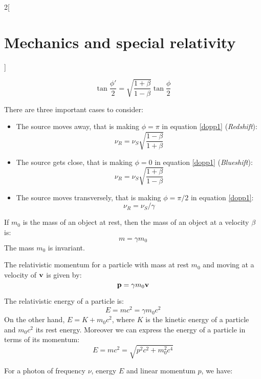 \documentclass[../../../main.tex]{subfiles}
\begin{document}
\begin{multicols}{2}[\section{Mechanics and special relativity}]
\begin{prop}
        $$\tan\frac{\phi'}{2}=\sqrt{\frac{1+\beta}{1-\beta}}\tan\frac{\phi}{2}$$
    \end{prop}
    \begin{center}
        \begin{minipage}{\linewidth}
            \centering
            
        \end{minipage}
    \end{center}
    \begin{corollary}
        There are three important cases to consider:
        \begin{itemize}
            \item The source moves away, that is making $\phi=\pi$ in equation \eqref{dopp1} (\textit{Redshift}):
                  $$\nu_R=\nu_S\sqrt{\frac{1-\beta}{1+\beta}}$$
            \item The source gets close, that is making $\phi=0$ in equation \eqref{dopp1} (\textit{Blueshift}):
                  $$\nu_R=\nu_S\sqrt{\frac{1+\beta}{1-\beta}}$$
            \item The source moves transversely, that is making $\phi=\pi/2$ in equation \eqref{dopp1}:$$\nu_R=\nu_S/\gamma$$
        \end{itemize}
    \end{corollary}
    \begin{prop}
        If $m_0$ is the mass of an object at rest, then the mass of an object at a velocity $\beta$ is: $$m=\gamma m_0$$ The mass $m_0$ is invariant.
    \end{prop}
    \begin{prop}
        The relativistic momentum for a particle with mass at rest $m_0$ and moving at a velocity of $\boldsymbol{\mathrm{v}}$ is given by: $$\boldsymbol{\mathrm{p}}=\gamma m_0\boldsymbol{\mathrm{v}}$$
    \end{prop}
    \begin{prop}
        The relativistic energy of a particle is: $$E=mc^2=\gamma m_0c^2$$ On the other hand, $E=K+m_0c^2$, where $K$ is the kinetic energy of a particle and $m_0c^2$ its rest energy. Moreover we can express the energy of a particle in terms of its momentum:
        $$E=mc^2=\sqrt{p^2c^2+m_0^2c^4}$$
    \end{prop}
    \begin{prop}
        For a photon of frequency $\nu$, energy $E$ and linear momentum $p$, we have:

\end{prop}
\end{multicols}
\end{document}
